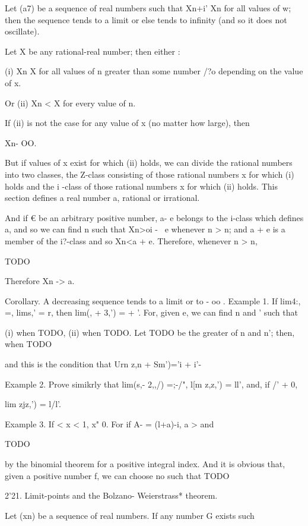 %
%


Let (a7) be a sequence of real numbers such that Xn+i' Xn for all
values of w; then the sequence tends to a limit or else tends to
infinity (and so it does not oscillate).

Let X be any rational-real number; then either :

(i) Xn X for all values of n greater than some number /?o depending on
the value of x.

Or (ii) Xn < X for every value of n.

If (ii) is not the case for any value of x (no matter how large), then

Xn- OO.

But if values of x exist for which (ii) holds, we can divide the
rational numbers into two classes, the Z-class consisting of those
rational numbers x for which (i) holds and the i -class of those
rational numbers x for which (ii) holds. This section defines a real
number a, rational or irrational.

And if € be an arbitrary positive number, a- e belongs to the i-class
which defines a, and so we can find n such that Xn>oi - \ e whenever n
> n; and a + e is a member of the i?-class and so Xn<a + e.
Therefore, whenever n > n,

TODO

Therefore Xn -> a.

Corollary. A decreasing sequence tends to a limit or to - oo . Example
1. If lim4:, =, lims,' = r, then lim(, + 3,') = + '. For, given
e, we can find n and ' such that

(i) when TODO, (ii) when TODO. Let TODO be the greater of n and n';
then, when TODO

and this is the condition that Urn z,n + Sm')='i + i'-

Example 2. Prove simikrly that lim(s,- 2,,/) =;-/", l[m z,z,') =
ll', and, if /' + 0,

lim zjz,') = l/l'.

Example 3. If < x < 1, x" 0. For if A- = (l+a)-i, a > and

TODO

by the binomial theorem for a positive integral index. And it is
obvious that, given a positive number f, we can choose no such that
TODO

2'21. Limit-points and the Bolzano- Weierstrass* theorem.

Let (xn) be a sequence of real numbers. If any number G exists such


